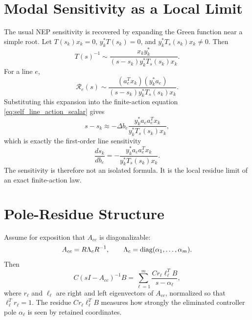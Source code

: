 \section{Modal Sensitivity as a Local Limit}

The usual NEP sensitivity is recovered by expanding the Green function near a
simple root. Let \(T(s_k)x_k=0\), \(y_k^*T(s_k)=0\), and
\(y_k^*T_s(s_k)x_k\ne0\). Then
\begin{equation}
  T(s)^{-1}
  \sim
  \frac{x_ky_k^*}
  {(s-s_k)y_k^*T_s(s_k)x_k}.
  \label{eq:self_green_pole_expansion}
\end{equation}
For a line \(e\),
\begin{equation}
  \mathcal R_e(s)
  \sim
  \frac{(a_e^Tx_k)(y_k^*a_e)}
  {(s-s_k)y_k^*T_s(s_k)x_k}.
  \label{eq:self_resistance_residue}
\end{equation}
Substituting this expansion into the finite-action equation
\eqref{eq:self_line_action_scalar} gives
\begin{equation}
  s-s_k
  \approx
  -\Delta b_e
  \frac{y_k^*a_ea_e^Tx_k}
  {y_k^*T_s(s_k)x_k},
  \label{eq:self_line_local_shift}
\end{equation}
which is exactly the first-order line sensitivity
\begin{equation}
  \frac{ds_k}{db_e}
  =
  -
  \frac{y_k^*a_ea_e^Tx_k}
  {y_k^*T_s(s_k)x_k}.
  \label{eq:self_line_sensitivity_limit}
\end{equation}
The sensitivity is therefore not an isolated formula. It is the local residue
limit of an exact finite-action law.

\section{Pole-Residue Structure}

Assume for exposition that \(A_{cc}\) is diagonalizable:
\begin{equation}
  A_{cc}=R\Lambda_c R^{-1},\qquad
  \Lambda_c=\operatorname{diag}(\alpha_1,\ldots,\alpha_m).
\end{equation}
Then
\begin{equation}
  C(sI-A_{cc})^{-1}B
  =
  \sum_{\ell=1}^m
  \frac{C r_\ell \ell_\ell^T B}{s-\alpha_\ell},
  \label{eq:self_partial_fraction}
\end{equation}
where \(r_\ell\) and \(\ell_\ell\) are right and left eigenvectors of
\(A_{cc}\), normalized so that \(\ell_\ell^Tr_\ell=1\). The residue
\(C r_\ell \ell_\ell^T B\) measures how strongly the eliminated controller pole
\(\alpha_\ell\) is seen by retained coordinates.

